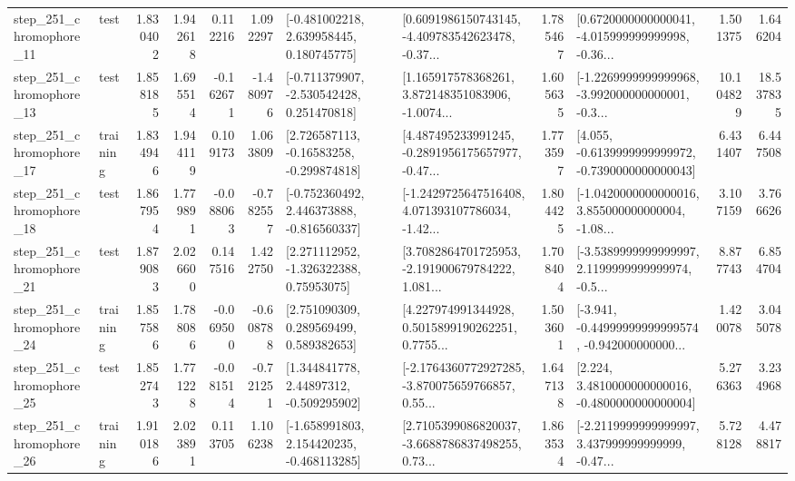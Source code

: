 \begin{tabular}{llrrrrllrlrr}
  step\_251\_chromophore\_11 &      test &      1.830402 &    1.942618 &      0.112216 &  1.092297 &    [-0.481002218, 2.639958445, 0.180745775] &  [0.6091986150743145, -4.409783542623478, -0.37... &       1.785467 &  [0.6720000000000041, -4.015999999999998, -0.36... &            1.501375 &          1.646204 \\
  step\_251\_chromophore\_13 &      test &      1.858185 &    1.695514 &     -0.162671 & -1.480976 &   [-0.711379907, -2.530542428, 0.251470818] &  [1.165917578368261, 3.872148351083906, -1.0074... &       1.605635 &  [-1.2269999999999968, -3.992000000000001, -0.3... &           10.104829 &         18.537835 \\
  step\_251\_chromophore\_17 &  training &      1.834946 &    1.944119 &      0.109173 &  1.063809 &    [2.726587113, -0.16583258, -0.299874818] &  [4.487495233991245, -0.2891956175657977, -0.47... &       1.773597 &  [4.055, -0.6139999999999972, -0.7390000000000043] &            6.431407 &          6.447508 \\
  step\_251\_chromophore\_18 &      test &      1.867954 &    1.779891 &     -0.088063 & -0.782557 &   [-0.752360492, 2.446373888, -0.816560337] &  [-1.2429725647516408, 4.071393107786034, -1.42... &       1.804425 &  [-1.0420000000000016, 3.855000000000004, -1.08... &            3.107159 &          3.766626 \\
  step\_251\_chromophore\_21 &      test &      1.879083 &    2.026600 &      0.147516 &  1.422750 &     [2.271112952, -1.326322388, 0.75953075] &  [3.7082864701725953, -2.191900679784222, 1.081... &       1.708404 &  [-3.5389999999999997, 2.1199999999999974, -0.5... &            8.877743 &          6.854704 \\
  step\_251\_chromophore\_24 &  training &      1.857586 &    1.788086 &     -0.069500 & -0.608788 &     [2.751090309, 0.289569499, 0.589382653] &  [4.227974991344928, 0.5015899190262251, 0.7755... &       1.503601 &  [-3.941, -0.44999999999999574, -0.942000000000... &            1.420078 &          3.045078 \\
  step\_251\_chromophore\_25 &      test &      1.852743 &    1.771228 &     -0.081514 & -0.721251 &     [1.344841778, 2.44897312, -0.509295902] &  [-2.1764360772927285, -3.870075659766857, 0.55... &       1.647138 &   [2.224, 3.4810000000000016, -0.4800000000000004] &            5.276363 &          3.234968 \\
  step\_251\_chromophore\_26 &  training &      1.910186 &    2.023891 &      0.113705 &  1.106238 &   [-1.658991803, 2.154420235, -0.468113285] &  [2.7105399086820037, -3.6688786837498255, 0.73... &       1.863534 &  [-2.2119999999999997, 3.437999999999999, -0.47... &            5.728128 &          4.478817 \\

\end{tabular}
